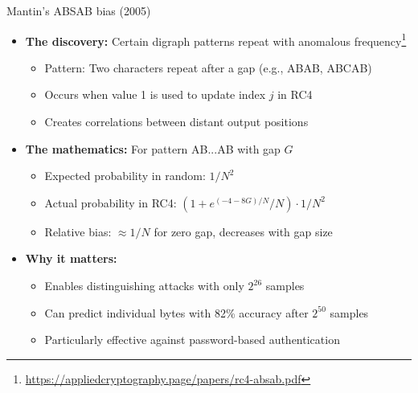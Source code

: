 \documentclass[aspectratio=169, lualatex, handout]{beamer}
\begin{document}
\begin{frame}{Mantin's ABSAB bias (2005)}
	\begin{itemize}[<+->]
		\item \textbf{The discovery:} Certain digraph patterns repeat with anomalous frequency\footnote{\url{https://appliedcryptography.page/papers/rc4-absab.pdf}}
		      \begin{itemize}[<+->]
			      \item Pattern: Two characters repeat after a gap (e.g., ABAB, ABCAB)
			      \item Occurs when value 1 is used to update index $j$ in RC4
			      \item Creates correlations between distant output positions
		      \end{itemize}
		\item \textbf{The mathematics:} For pattern AB...AB with gap $G$
		      \begin{itemize}[<+->]
			      \item Expected probability in random: $1/N^2$
			      \item Actual probability in RC4: $(1 + e^{(-4-8G)/N}/N) \cdot 1/N^2$
			      \item Relative bias: $\approx 1/N$ for zero gap, decreases with gap size
		      \end{itemize}
		\item \textbf{Why it matters:}
		      \begin{itemize}[<+->]
			      \item Enables distinguishing attacks with only $2^{26}$ samples
			      \item Can predict individual bytes with 82\% accuracy after $2^{50}$ samples
			      \item Particularly effective against password-based authentication
		      \end{itemize}
	\end{itemize}
\end{frame}
\end{document}

